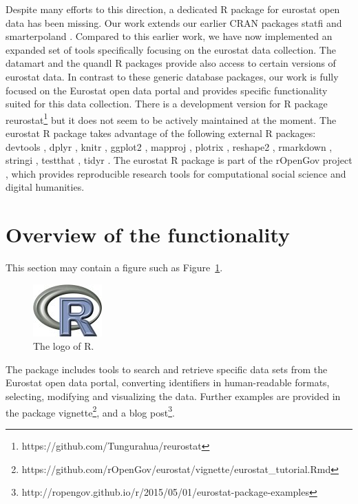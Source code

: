 Despite many efforts to this direction, a dedicated R package for
eurostat open data has been missing. Our work extends our earlier CRAN
packages statfi \citep{statfi} and
smarterpoland \citep{smarterpoland}. Compared to this earlier work, we
have now implemented an expanded set of tools specifically focusing on
the eurostat data collection. The datamart \citep{datamart} and the
quandl \citep{quandl} R packages provide also access to certain
versions of eurostat data. In contrast to these generic database
packages, our work is fully focused on the Eurostat open data portal
and provides specific functionality suited for this data
collection. There is a development version for R package
reurostat\footnote{https://github.com/Tungurahua/reurostat} but it
does not seem to be actively maintained at the moment. The eurostat R
package takes advantage of the following external R packages:
devtools \citep{devtools}, dplyr \citep{dplyr}, knitr \citep{knitr},
ggplot2 \citep{ggplot2}, mapproj \citep{mapproj},
plotrix \citep{plotrix}, reshape2 \citep{reshape2},
rmarkdown \citep{rmarkdown}, stringi \citep{stringi},
testthat \citep{testthat}, tidyr \citep{tidyr}. The eurostat R package
is part of the rOpenGov project
\citep{Lahti13icml}, which provides reproducible research
tools for computational social science and digital humanities.


\section{Overview of the functionality}



This section may contain a figure such as Figure~\ref{figure:rlogo}.

\begin{figure}[htbp]
  \centering
  \includegraphics{Rlogo}
  \caption{The logo of R.}
  \label{figure:rlogo}
\end{figure}

The package includes tools to search and retrieve specific data sets
from the Eurostat open data portal, converting identifiers in
human-readable formats, selecting, modifying and visualizing the
data. Further examples are provided in the package
vignette\footnote{https://github.com/rOpenGov/eurostat/vignette/eurostat\_tutorial.Rmd},
and a blog
post\footnote{http://ropengov.github.io/r/2015/05/01/eurostat-package-examples}.

